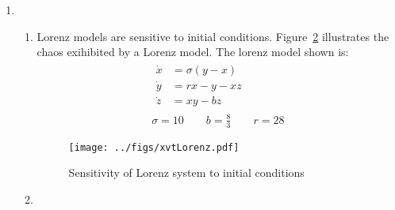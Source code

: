 \documentclass[12pt,a4]{article}
\begin{document}
\begin{enumerate}
\begin{enumerate}
      \item
        Figure~\ref{fig:SIRbetaHalved} shows that halving $\beta$ (the contagiousness parameter) has a large impact on the infection curve.
        The curve is flatter and hence fewer people are infected at one time.
        This situation allows hospitals to keep up with new infections.
        \begin{figure}[H]
          \centering
          \texttt{[image: ../figs/SIRbetaHalved.pdf]}
          \caption{Evolution of an SIR model through time}
          \label{fig:SIRbetaHalved}
        \end{figure}
        \begin{enumerate}
          \item If the disease has these parameters, the infecaions peak at approximately .
          \item At the peak  people will be infected at the same time.
          \item After approximately  days, no single person should be infected.
          \item The proportion of people who will be infected is .
        \end{enumerate}
  \end{enumerate}
  \item
    \begin{enumerate}
      \item
        Lorenz models are sensitive to initial conditions.
        Figure~\ref{fig:xvtLorenz} illustrates the chaos exihibited by a Lorenz model.
        The lorenz model shown is:
        \begin{gather*}
          \begin{split}
            \dot x &= \sigma(y - x)\\
            \dot y &= rx - y - xz\\
            \dot z &= xy - bz
          \end{split}\\
          \sigma = 10 \qquad b = \frac{8}{3} \qquad r = 28
        \end{gather*}
        \begin{figure}[H]
          \centering
          \texttt{[image: ../figs/xvtLorenz.pdf]}
          \caption{Sensitivity of Lorenz system to initial conditions}
          \label{fig:xvtLorenz}
        \end{figure}
      \item

\end{enumerate}
\end{enumerate}
\end{document}
